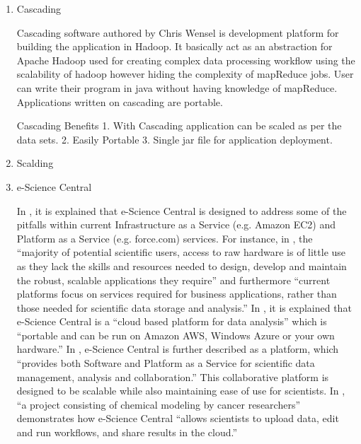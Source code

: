 \begin{enumerate}
\item {} 
Cascading

\label{\detokenize{i524/technologies:id42}}{\hyperref[\detokenize{i524/technologies:www-cascading}]{\sphinxcrossref{{[}37{]}}}} Cascading software authored by Chris Wensel
is development platform for building the application in Hadoop.
It basically act as an abstraction for Apache Hadoop used for
creating complex data processing workflow using the scalability of
hadoop however hiding the complexity of mapReduce jobs.  User can
write their program in java without having knowledge of
mapReduce. Applications written on cascading are portable.

Cascading Benefits
1. With Cascading application can be scaled as per the data sets.
2. Easily Portable
3. Single jar file for application deployment.

\item {} 
Scalding

\item {} 
e-Science Central

In \label{\detokenize{i524/technologies:id43}}{\hyperref[\detokenize{i524/technologies:e-science-central-paper-2010}]{\sphinxcrossref{{[}38{]}}}}, it is explained that
e-Science Central is designed to address some of the pitfalls
within current Infrastructure as a Service (e.g.  Amazon EC2) and
Platform as a Service (e.g. force.com) services. For instance, in
\label{\detokenize{i524/technologies:id44}}{\hyperref[\detokenize{i524/technologies:e-science-central-paper-2010}]{\sphinxcrossref{{[}38{]}}}}, the ``majority of potential
scientific users, access to raw hardware is of little use as they
lack the skills and resources needed to design, develop and
maintain the robust, scalable applications they require'' and
furthermore ``current platforms focus on services required for
business applications, rather than those needed for scientific
data storage and analysis.'' In \label{\detokenize{i524/technologies:id45}}{\hyperref[\detokenize{i524/technologies:www-e-science-central}]{\sphinxcrossref{{[}39{]}}}}, it
is explained that e-Science Central is a ``cloud based platform for
data analysis'' which is ``portable and can be run on Amazon AWS,
Windows Azure or your own hardware.'' In
\label{\detokenize{i524/technologies:id46}}{\hyperref[\detokenize{i524/technologies:e-science-central-paper-2010}]{\sphinxcrossref{{[}38{]}}}}, e-Science Central is further
described as a platform, which ``provides both Software and
Platform as a Service for scientific data management, analysis and
collaboration.'' This collaborative platform is designed to be
scalable while also maintaining ease of use for scientists. In
\label{\detokenize{i524/technologies:id47}}{\hyperref[\detokenize{i524/technologies:e-science-central-paper-2010}]{\sphinxcrossref{{[}38{]}}}}, ``a project consisting of
chemical modeling by cancer researchers'' demonstrates how
e-Science Central ``allows scientists to upload data, edit and run
workflows, and share results in the cloud.''


\end{enumerate}
